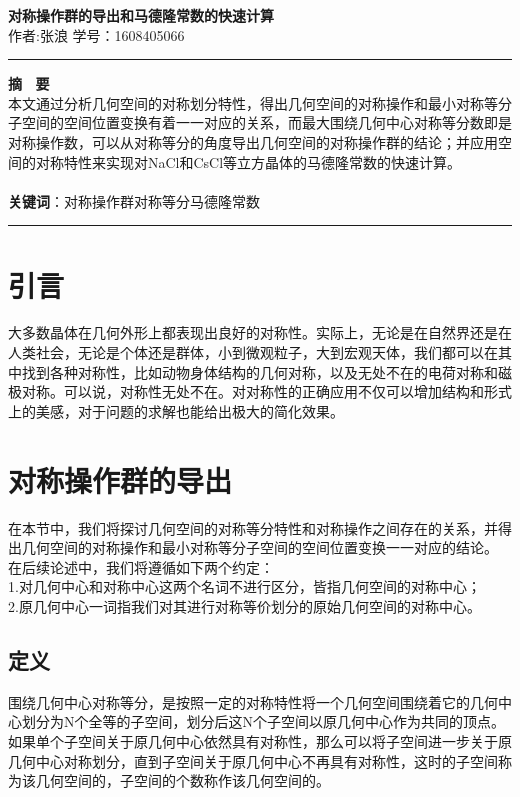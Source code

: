 \documentclass{style}
\begin{document}
\begin{center}
      \LARGE \textbf{对称操作群的导出和马德隆常数的快速计算}\\
      \vspace{0.3em}
      \large 作者:张浪 \quad 学号：1608405066 \\ %
\end{center}
\rule[0.1\baselineskip]{\textwidth}{0.5pt}
\textbf{摘 \ 要}\\
\large
本文通过分析几何空间的对称划分特性，得出几何空间的对称操作和最小对称等分子空间的空间位置变换有着一一对应的关系，而最大围绕几何中心对称等分数即是对称操作数，可以从对称等分的角度导出几何空间的对称操作群的结论；并应用空间的对称特性来实现对NaCl和CsCl等立方晶体的马德隆常数的快速计算。
\\
\\
\textbf{关键词}：对称操作群\quad 对称等分\quad 马德隆常数\\
\rule[0.1\baselineskip]{\textwidth}{0.5pt}
\section*{引言}
大多数晶体在几何外形上都表现出良好的对称性。实际上，无论是在自然界还是在人类社会，无论是个体还是群体，小到微观粒子，大到宏观天体，我们都可以在其中找到各种对称性，比如动物身体结构的几何对称，以及无处不在的电荷对称和磁极对称。可以说，对称性无处不在。对对称性的正确应用不仅可以增加结构和形式上的美感，对于问题的求解也能给出极大的简化效果。

\section{对称操作群的导出} %
\label{sec:对称操作群的导出}
在本节中，我们将探讨几何空间的对称等分特性和对称操作之间存在的关系，并得出几何空间的对称操作和最小对称等分子空间的空间位置变换一一对应的结论。\\
\indent 在后续论述中，我们将遵循如下两个约定：\\
\indent 1.对几何中心和对称中心这两个名词不进行区分，皆指几何空间的对称中心；\\
\indent 2.原几何中心一词指我们对其进行对称等价划分的原始几何空间的对称中心。
\subsection{定义}
围绕几何中心对称等分，是按照一定的对称特性将一个几何空间围绕着它的几何中心划分为N个全等的子空间，划分后这N个子空间以原几何中心作为共同的顶点。如果单个子空间关于原几何中心依然具有对称性，那么可以将子空间进一步关于原几何中心对称划分，直到子空间关于原几何中心不再具有对称性，这时的子空间称为该几何空间的，子空间的个数称作该几何空间的。
\end{document}
